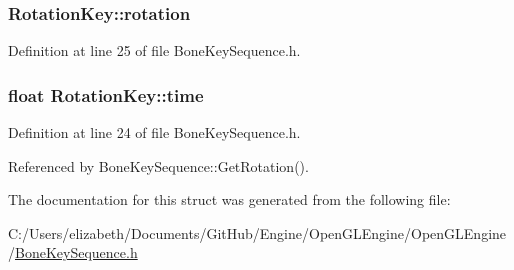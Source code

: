 \subsubsection[{\texorpdfstring{rotation}{rotation}}]{ Rotation\+Key\+::rotation}\hypertarget{struct_rotation_key_a9638fbf119b41fd844b3d24c9e95d52d}{}\label{struct_rotation_key_a9638fbf119b41fd844b3d24c9e95d52d}


Definition at line 25 of file Bone\+Key\+Sequence.\+h.

\subsubsection[{\texorpdfstring{time}{time}}]{\setlength{\rightskip}{0pt plus 5cm}float Rotation\+Key\+::time}\hypertarget{struct_rotation_key_a421ab28d247b062e4c46e4879943ee7d}{}\label{struct_rotation_key_a421ab28d247b062e4c46e4879943ee7d}


Definition at line 24 of file Bone\+Key\+Sequence.\+h.



Referenced by Bone\+Key\+Sequence\+::\+Get\+Rotation().



The documentation for this struct was generated from the following file\+:\begin{DoxyCompactItemize}
\item 
C\+:/\+Users/elizabeth/\+Documents/\+Git\+Hub/\+Engine/\+Open\+G\+L\+Engine/\+Open\+G\+L\+Engine/\hyperlink{_bone_key_sequence_8h}{Bone\+Key\+Sequence.\+h}\end{DoxyCompactItemize}
